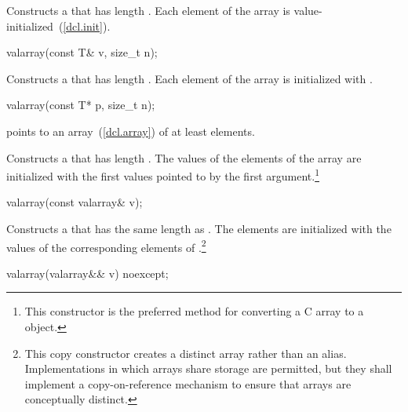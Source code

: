 \begin{itemdescr}
\pnum
\effects
Constructs a  that has length .
Each element of the array is value-initialized~(\ref{dcl.init}).
\end{itemdescr}

%
\begin{itemdecl}
valarray(const T& v, size_t n);
\end{itemdecl}

\begin{itemdescr}
\pnum
\effects
Constructs a  that has length .
Each element of the array is initialized with .
\end{itemdescr}

%
\begin{itemdecl}
valarray(const T* p, size_t n);
\end{itemdecl}

\begin{itemdescr}
\pnum
\requires
{} points to an array~(\ref{dcl.array}) of at least
 elements.

\effects
Constructs a  that has length .
The values of the elements of the array are initialized with the
first
values pointed to by the first argument.\footnote{This constructor is the
preferred method for converting a C array to a
object.}
\end{itemdescr}

%
\begin{itemdecl}
valarray(const valarray& v);
\end{itemdecl}

\begin{itemdescr}
\pnum
\effects
Constructs a  that has the same length as .
The elements are initialized with the values of the corresponding
elements of .\footnote{This copy constructor creates
a distinct array rather than an alias.
Implementations in which arrays share storage are permitted, but they
shall implement a copy-on-reference mechanism to ensure that arrays are
conceptually distinct.}
\end{itemdescr}

%
\begin{itemdecl}
valarray(valarray&& v) noexcept;
\end{itemdecl}

